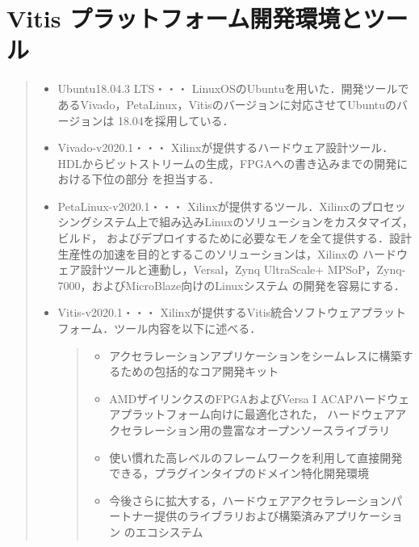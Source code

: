 \documentclass[11pt,a4j]{jreport}
\begin{document}
\section{Vitis プラットフォーム開発環境とツール}
\begin{quote}
  \begin{itemize}
    \item Ubuntu18.04.3 LTS・・・
    LinuxOSのUbuntuを用いた．開発ツールであるVivado，PetaLinux，Vitisのバージョンに対応させてUbuntuのバージョンは
    18.04を採用している．
    \item Vivado-v2020.1・・・
    Xilinxが提供するハードウェア設計ツール．HDLからビットストリームの生成，FPGAへの書き込みまでの開発における下位の部分
    を担当する．
    \item PetaLinux-v2020.1・・・
    Xilinxが提供するツール．Xilinxのプロセッシングシステム上で組み込みLinuxのソリューションをカスタマイズ，ビルド，
    およびデプロイするために必要なモノを全て提供する．設計生産性の加速を目的とするこのソリューションは，Xilinxの
    ハードウェア設計ツールと連動し，Versal，Zynq UltraScale+ MPSoP，Zynq-7000，およびMicroBlaze向けのLinuxシステム
    の開発を容易にする．
    \item Vitis-v2020.1・・・
    Xilinxが提供するVitis統合ソフトウェアプラットフォーム．ツール内容を以下に述べる．
    \begin{quote}
      \begin{itemize}
        \item アクセラレーションアプリケーションをシームレスに構築するための包括的なコア開発キット
        \item AMDザイリンクスのFPGAおよびVersa I ACAPハードウェアプラットフォーム向けに最適化された，
        ハードウェアアクセラレーション用の豊富なオープンソースライブラリ
        \item 使い慣れた高レベルのフレームワークを利用して直接開発できる，プラグインタイプのドメイン特化開発環境
        \item 今後さらに拡大する，ハードウェアアクセラレーションパートナー提供のライブラリおよび構築済みアプリケーション
        のエコシステム
      \end{itemize}
    \end{quote}
  \end{itemize}
\end{quote}
\end{document}
